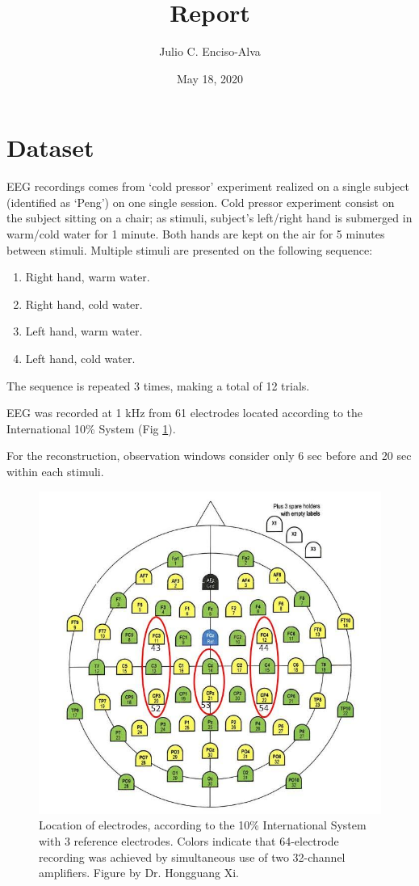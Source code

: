 \documentclass[10pt,letterpaper]{article}
\title{Report}
\date{May 18, 2020}
\author{Julio C. Enciso-Alva}
\begin{document}
\maketitle

\section{Dataset}

EEG recordings comes from
`cold pressor' experiment realized on
a single subject (identified as `Peng') on one single session. 
Cold pressor experiment consist on the subject sitting on a chair;
as stimuli, subject's left/right hand is submerged 
in warm/cold water for 1 minute. Both hands are kept on the air  for 5 minutes between stimuli. 
Multiple stimuli are presented on the following sequence:
\begin{enumerate}
	\item Right hand, warm water.
	\item Right hand, cold water.
	\item Left hand, warm water.
	\item Left hand, cold water.
\end{enumerate}
The sequence is repeated 3 times, making a total of 12 trials.

EEG was recorded at 1 kHz from 61 electrodes located according to the International 10\% System (Fig \ref{fig:electrodes}). 

For the reconstruction, observation windows consider only 6 sec before and 20 sec within each stimuli.

\begin{figure}
\centering
	\includegraphics[width=0.6\linewidth]{easycap_layout_peng}
	\caption{Location of electrodes, according to the 10\% International System with 3 reference electrodes.
	Colors indicate that 64-electrode recording was achieved by simultaneous use of two 32-channel
	amplifiers. Figure by Dr. Hongguang Xi.}
	\label{fig:electrodes}
\end{figure}
\end{document}
